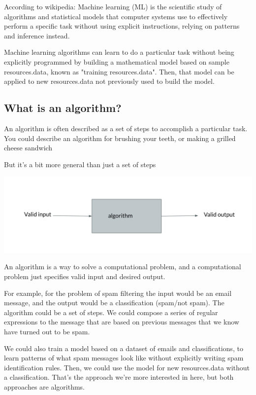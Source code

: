 \documentclass[12pt]{article}
\begin{document}
According to wikipedia:
Machine learning (ML) is the scientific study of algorithms and statistical models that computer systems use to 
effectively perform a specific task without using explicit instructions, relying on patterns and inference instead.


Machine learning algorithms can learn to do a particular task without being explicitly programmed by building a 
mathematical model based on sample resources.data, known as "training resources.data". Then, that model can be applied to new resources.data
not previously used to build the model. 

\subsection{What is an algorithm?}

An algorithm is often described as a set of steps to accomplish a particular task. You could describe an algorithm for brushing your teeth, or making a grilled cheese sandwich 

But it's a bit more general than just a set of steps 

\includegraphics[width={\textwidth}]{algo-abstract}


An algorithm is a way to solve a computational problem, and a computational problem just specifies valid input and desired output. 

For example, for the problem of spam filtering the input would be an email message, and the output would be a 
classification (spam/not spam). The algorithm could be a set of steps. We could compose a series of regular expressions to 
the message that are based on previous messages that we know have turned out to be spam. 

We could also train a model based on a dataset of emails and classifications, to learn patterns of what spam messages 
look like without explicitly writing spam identification rules. Then, we could use the model for new resources.data without a
classification. That's the approach we're more interested in here, but both approaches are algorithms.
\end{document}
